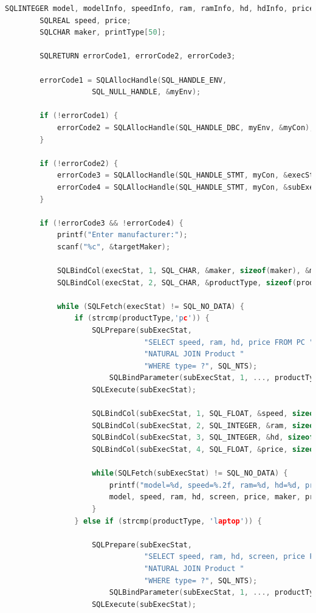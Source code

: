 \documentclass[12pt]{article}
\begin{document}
\begin{enumerate}[1.]
\begin{enumerate}[a)]
\begin{lstlisting}[language=c]
        SQLINTEGER model, modelInfo, speedInfo, ram, ramInfo, hd, hdInfo, priceInfo, makerInfo, screen, screenInfo, color, colorInfo, printTypeInfo;
        SQLREAL speed, price;
        SQLCHAR maker, printType[50];

        SQLRETURN errorCode1, errorCode2, errorCode3;

        errorCode1 = SQLAllocHandle(SQL_HANDLE_ENV,
                    SQL_NULL_HANDLE, &myEnv);

        if (!errorCode1) {
            errorCode2 = SQLAllocHandle(SQL_HANDLE_DBC, myEnv, &myCon);
        }

        if (!errorCode2) {
            errorCode3 = SQLAllocHandle(SQL_HANDLE_STMT, myCon, &execStat);
            errorCode4 = SQLAllocHandle(SQL_HANDLE_STMT, myCon, &subExecStat);
        }

        if (!errorCode3 && !errorCode4) {
            printf("Enter manufacturer:");
            scanf("%c", &targetMaker);

            SQLBindCol(execStat, 1, SQL_CHAR, &maker, sizeof(maker), &makerInfo);
            SQLBindCol(execStat, 2, SQL_CHAR, &productType, sizeof(productType), &productTypeInfo);

            while (SQLFetch(execStat) != SQL_NO_DATA) {
                if (strcmp(productType,'pc')) {
                    SQLPrepare(subExecStat,
                                "SELECT speed, ram, hd, price FROM PC "
                                "NATURAL JOIN Product "
                                "WHERE type= ?", SQL_NTS);
                        SQLBindParameter(subExecStat, 1, ..., productType, ...);
                    SQLExecute(subExecStat);

                    SQLBindCol(subExecStat, 1, SQL_FLOAT, &speed, sizeof(speed), &speedInfo);
                    SQLBindCol(subExecStat, 2, SQL_INTEGER, &ram, sizeof(ram), &ramInfo);
                    SQLBindCol(subExecStat, 3, SQL_INTEGER, &hd, sizeof(hd), &hdInfo);
                    SQLBindCol(subExecStat, 4, SQL_FLOAT, &price, sizeof(price), &priceInfo);

                    while(SQLFetch(subExecStat) != SQL_NO_DATA) {
                        printf("model=%d, speed=%.2f, ram=%d, hd=%d, price=%.2f, maker=%c, type=%s",
                        model, speed, ram, hd, screen, price, maker, productType);
                    }
                } else if (strcmp(productType, 'laptop')) {

                    SQLPrepare(subExecStat,
                                "SELECT speed, ram, hd, screen, price FROM Laptop "
                                "NATURAL JOIN Product "
                                "WHERE type= ?", SQL_NTS);
                        SQLBindParameter(subExecStat, 1, ..., productType, ...);
                    SQLExecute(subExecStat);


\end{lstlisting}
\end{enumerate}
\end{enumerate}
\end{document}
